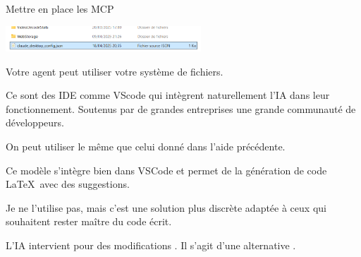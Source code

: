 \begin{Aide}
\begin{bfbox}{Mettre en place les MCP}
\begin{tcbenumerate}[2]
        \vspace{-0.3cm}\begin{center}\includegraphics[width=0.55\textwidth]{images/Claude-setup-mcp/3.png}\end{center}

        \tcbitem Votre agent peut utiliser votre système de fichiers. 
    \end{tcbenumerate}
    \end{bfbox}
\end{Aide}

\begin{Aide}
    Ce sont des IDE comme VScode qui intègrent naturellement l'IA dans leur fonctionnement. Soutenus par de grandes entreprises une grande communauté de développeurs.

    On peut utiliser le même  que celui donné dans l'aide précédente. 
\end{Aide}

\begin{Aide}
    Ce modèle s'intègre bien dans VSCode et permet de la génération de code \LaTeX\ avec des suggestions. 

    Je ne l'utilise pas, mais c'est une solution plus discrète adaptée à ceux qui souhaitent rester maître du code écrit. 
    
    L'IA intervient pour  des modifications . Il s'agit d'une alternative .
\end{Aide}

